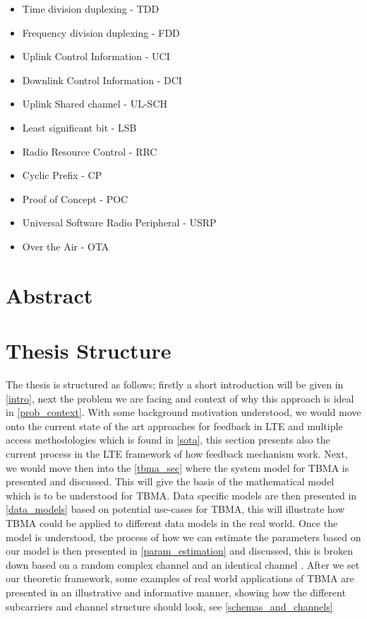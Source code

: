 \documentclass{article}
\begin{document}
\begin{itemize}
\item Time division duplexing - TDD
\item Frequency division duplexing - FDD
\item Uplink Control Information - UCI
\item Downlink Control Information - DCI
\item Uplink Shared channel - UL-SCH 
\item Least significant bit - LSB
\item Radio Resource Control - RRC
\item Cyclic Prefix - CP
\item Proof of Concept - POC
\item Universal Software Radio Peripheral - USRP
\item Over the Air - OTA
\end{itemize} 
\newpage


\section{Abstract}
\newpage
\section{Thesis Structure}
The thesis is structured as follows; firstly a short introduction will be given in \cref{intro}, next the problem we are facing and context of why this approach is ideal in \cref{prob_context}. With some background motivation understood, we would move onto the current state of the art approaches for feedback in LTE and multiple access methodologies which is found in \cref{sota}, this section presents also the current process in the LTE framework of how feedback mechanism work. Next, we would move then into the \cref{tbma_sec} where the system model for TBMA is presented and discussed. This will give the basis of the mathematical model which is to be understood for TBMA. Data specific models are then presented in \cref{data_models} based on potential use-cases for TBMA, this will illustrate how TBMA could be applied to different data models in the real world. Once the model is understood, the process of how we can estimate the parameters based on our model is then presented in \cref{param_estimation} and discussed, this is broken down based on a random complex channel and an identical channel \cite{tbma}. After we set our theoretic framework, some examples of real world applications of TBMA are presented in an illustrative and informative manner, showing how the different subcarriers and channel structure should look, see \cref{schemas_and_channels}
\end{document}
